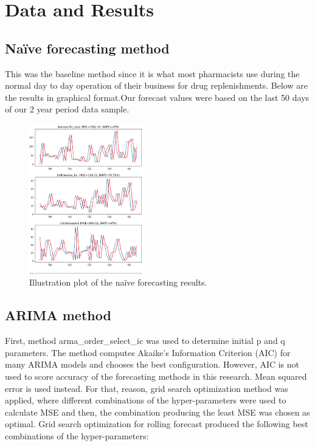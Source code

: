 \documentclass[12pt]{report}
\begin{document}
  



\section{Data and Results}

\subsection{Naïve forecasting method}
This was the baseline method since it is what most pharmacists use during the normal day to day operation of their business for drug replenishments. Below are the results in graphical format.Our forecast values were based on the last 50 days of our 2 year period data sample.
\begin{figure}[H]%
  \begin {center}
  \includegraphics[width=0.45\textwidth]{images/download (13).png}
  \caption{Illustration plot of the naïve forecasting results.}
  \label{fig:ecg}
  \end {center}
\end{figure}


\subsection{ARIMA  method}

 First, method arma\_order\_select\_ic was used to determine initial p and q parameters. The method computes Akaike’s Information Criterion (AIC) for many ARIMA models and chooses the best configuration. However, AIC is not used to score accuracy of the forecasting methods in this research. Mean squared error is used instead. For that, reason, grid search optimization method was applied, where different combinations of the hyper-parameters were used to calculate MSE and then, the combination producing the least MSE was chosen as optimal. Grid search optimization for rolling forecast produced the following best combinations of the hyper-parameters:
 
\end{document}
